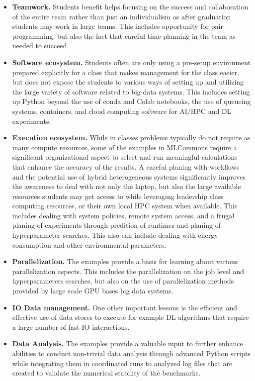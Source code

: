 \documentclass[utf8]{FrontiersinVancouver} %
\begin{document}
\begin{itemize}

  \item {\bf Teamwork.} Students benefit helps focusing on the
    success and collaboration of the entire team rather than just an
    individualism as after graduation students may work in large
    teams. This includes opportunity for pair programming, but also the
    fact that careful time planning in the team as needed to succeed.

  \item {\bf Software ecosystem.} Students often are only using a
    pre-setup environment prepared explicitly for a class that makes
    management for the class easier, but does not expose the students
    to various ways of setting up and utilizing the large variety of
    software related to big data systems. This includes setting up
    Python beyond the use of conda and Colab notebooks, the use of
    queueing systems, containers, and cloud computing software for
    AI/HPC and DL experiments.

  \item {\bf Execution ecosystem.} While in classes problems typically
    do not require as many compute resources, some of the examples in
    MLCommons require a significant organizational aspect to select
    and run meaningful calculations that enhance the accuracy of the
    results. A careful planing with workflows and the potential use
    of hybrid heterogeneous systems significantly improves the
    awareness to deal with not only the laptop, but also the large
    available resources students may get access to while leveraging
    leadership class computing resources, or their own local HPC
    system when available. This includes dealing with system policies,
    remote system access, and a frugal planing of experiments through
    predition of runtimes and planing of hyperparameter searches. This
    also can include dealing with energy consumption and other
    environmental parameters.

  \item {\bf Parallelization.} The examples provide a basis for
    learning about various parallelization aspects. This includes the
    parallelization on the job level and hyperparameters searches, but
    also on the use of parallelization methods provided by large scale
    GPU bases big data systems.

  \item {\bf IO Data management.} One other important lessons is the
    efficient and effective use of data stores to execute for example
    DL algorithms that require a large number of fast IO interactions.

  \item {\bf Data Analysis.} The examples provide a valuable input to
    further enhance abilities to conduct non-trivial data analysis
    through advanced Python scripts while integrating them in
    coordinated runs to analyzed log files that are created to
    validate the numerical stability of the benchmarks.

\end{itemize}
\end{document}
